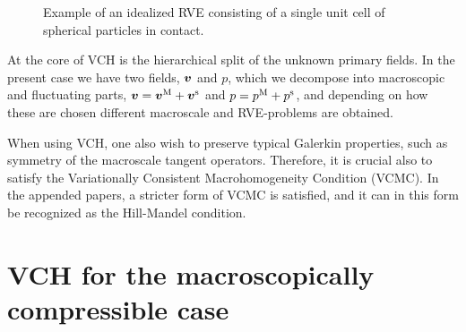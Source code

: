 \documentclass[MikaelDissertation.tex]{subfiles}
\begin{document}
\begin{figure}[htpb!]
\centering
{}
\caption{Example of an idealized RVE consisting of a single unit cell of spherical particles in contact.}
\label{fig:rve_example}
\end{figure}

At the core of VCH is the hierarchical split of the unknown primary fields.
In the present case we have two fields, $\boldsymbol{v}$ and $p$, which we decompose into macroscopic and fluctuating parts, $\boldsymbol{v} = \boldsymbol{v}^{\mathrm{M}} + \boldsymbol{v}^{\mathrm{s}}$ and $p = p^{\mathrm{M}} + p^{\mathrm{s}}$, and depending on how these are chosen different macroscale and RVE-problems are obtained.

When using VCH, one also wish to preserve typical Galerkin properties, such as symmetry of the macroscale tangent operators.
Therefore, it is crucial also to satisfy the Variationally Consistent Macrohomogeneity Condition (VCMC).
In the appended papers, a stricter form of VCMC is satisfied, and it can in this form be recognized as the Hill-Mandel condition.


\section{VCH for the macroscopically compressible case}
\end{document}
